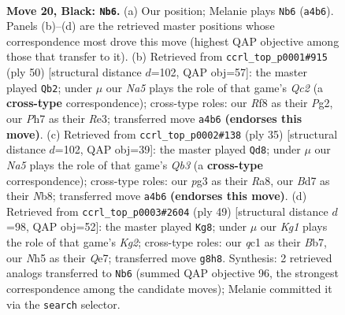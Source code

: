 \documentclass[11pt]{article}
\begin{document}
\clearpage

\begin{figure}[p]\centering
\begin{subfigure}{0.46\textwidth}\centering
\resizebox{\linewidth}{!}{%
\newchessgame
\chessboard[
  setfen={5rk1/3brppp/4p3/p1pq3n/n7/1P1NP1P1/P3BRPP/RNQ3K1 b - - 0 20},
  showmover=false,
  pgfstyle=straightmove, color=movearrow, markmove={a4-b6}
]}
\caption{}
\end{subfigure}\hfill
\begin{subfigure}{0.46\textwidth}\centering
\resizebox{\linewidth}{!}{%
\newchessgame
\chessboard[
  setfen={r2rb1k1/1pq2pp1/n2p1n1p/N3p3/1P2P3/2P1RN1P/2Q2PP1/3R1BK1 w - - 2 26},
  showmover=false,
  pgfstyle=straightmove, color=movearrow, markmove={c2-b2}
]}
\caption{}
\end{subfigure}
\\[4pt]
\begin{subfigure}{0.46\textwidth}\centering
\resizebox{\linewidth}{!}{%
\newchessgame
\chessboard[
  setfen={rn2rbk1/pp3pp1/1q1p1n1p/3P4/1P2P3/P3B1P1/5NBP/R2QR1K1 b - - 2 18},
  showmover=false,
  pgfstyle=straightmove, color=movearrow, markmove={b6-d8}
]}
\caption{}
\end{subfigure}\hfill
\begin{subfigure}{0.46\textwidth}\centering
\resizebox{\linewidth}{!}{%
\newchessgame
\chessboard[
  setfen={2r5/pb2qpk1/n2r2pp/2pp4/4n2P/1P2P1P1/PQ2NPB1/2RRN1K1 b - - 7 25},
  showmover=false,
  pgfstyle=straightmove, color=movearrow, markmove={g7-g8}
]}
\caption{}
\end{subfigure}
\caption{\textbf{Move 20, Black: \texttt{Nb6}.} (a) Our position; Melanie plays \texttt{Nb6} (\texttt{a4b6}). Panels (b)--(d) are the retrieved master positions whose correspondence most drove this move (highest QAP objective among those that transfer to it). (b) Retrieved from \texttt{ccrl\_top\_p0001\#915} (ply 50) [structural distance $d$=102, QAP obj=57]: the master played \texttt{Qb2}; under $\mu$ our \emph{Na5} plays the role of that game's \emph{Qc2} (a \textbf{cross-type} correspondence); cross-type roles: our \emph{R}f8 as their \emph{P}g2, our \emph{P}h7 as their \emph{R}e3; transferred move \texttt{a4b6} \textbf{(endorses this move)}. (c) Retrieved from \texttt{ccrl\_top\_p0002\#138} (ply 35) [structural distance $d$=102, QAP obj=39]: the master played \texttt{Qd8}; under $\mu$ our \emph{Na5} plays the role of that game's \emph{Qb3} (a \textbf{cross-type} correspondence); cross-type roles: our \emph{p}g3 as their \emph{R}a8, our \emph{B}d7 as their \emph{N}b8; transferred move \texttt{a4b6} \textbf{(endorses this move)}. (d) Retrieved from \texttt{ccrl\_top\_p0003\#2604} (ply 49) [structural distance $d$=98, QAP obj=52]: the master played \texttt{Kg8}; under $\mu$ our \emph{Kg1} plays the role of that game's \emph{Kg2}; cross-type roles: our \emph{q}c1 as their \emph{B}b7, our \emph{N}h5 as their \emph{Q}e7; transferred move \texttt{g8h8}. Synthesis: 2 retrieved analogs transferred to \texttt{Nb6} (summed QAP objective 96, the strongest correspondence among the candidate moves); Melanie committed it via the \texttt{search} selector.}
\label{fig:thought-m39}
\end{figure}
\end{document}
